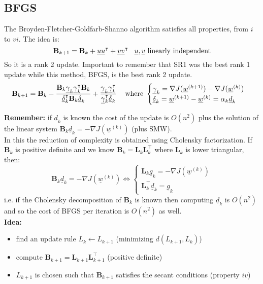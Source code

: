 \subsection{BFGS}
The Broyden-Fletcher-Goldfarb-Shanno algorithm satisfies all properties, from $i$ to $vi$. The idea is:
\[
    \mathbf{B}_{k+1} = \mathbf{B}_k + \underline{u}\underline{u}^\intercal + \underline{v}\underline{v}^\intercal \hspace{0.3cm} \underline{u},\underline{v}\text{ linearly independent} 
\] 
So it is a rank 2 update. Important to remember that SR1 was the best rank 1 update while this method, BFGS, is the best rank 2 update.
\[
    \mathbf{B}_{k+1} = \mathbf{B}_k - \frac{\mathbf{B}_k\underline{\gamma}_k\underline{\gamma}_k^\intercal \mathbf{B}_k}{\underline{\delta}_k^\intercal \mathbf{B}_k \underline{\delta}_k} + \frac{\underline{\gamma}_k\underline{\gamma}_k^\intercal}{\underline{\gamma}_k^\intercal \underline{\delta}_k} \hspace{0.3cm} \text{ where } \begin{cases}
        \underline{\gamma}_k = \nabla J(\underline{w}^{(k+1)}) - \nabla J(\underline{w}^{(k)})\\
        \underline{\delta}_k = \underline{w}^{(k+1)} - \underline{w}^{(k)} = \alpha_k \underline{d}_k
    \end{cases}
\]

\textbf{Remember: } if $\underline{d}_k$ is known the cost of the update is $O(n^2)$ plus the solution of the linear system $\mathbf{B}_k \underline{d}_k = - \nabla J(\underline{w}^{(k)})$ (plus SMW). \\

In this the reduction of complexity is obtained using Cholensky factorization. If $\mathbf{B}_k$ is positive definite and we know $\mathbf{B}_k = \mathbf{L}_k \mathbf{L}_k^\intercal$ where $\mathbf{L}_k$ is lower triangular, then:
\[
    \mathbf{B}_k \underline{d}_k = - \nabla J(\underline{w}^{(k)}) \iff \begin{cases}
        \mathbf{L}_k \underline{g}_k = - \nabla J(\underline{w}^{(k)})\\
        \mathbf{L}_k^\intercal \underline{d}_k = \underline{g}_k
    \end{cases}
\]
i.e. if the Cholensky decomposition of $\mathbf{B}_k$ is known then computing $\underline{d}_k$ is $O(n^2)$ and so the cost of BFGS per iteration is $O(n^2)$ as well.\\

\textbf{Idea: } 
\begin{itemize}
    \item find an update rule $L_k \leftarrow L_{k+1}$ (minimizing $d(L_{k+1}, L_k)$)
    \item compute $\mathbf{B}_{k+1} = \mathbf{L}_{k+1}\mathbf{L}_{k+1}^\intercal$ (positive definite)
    \item $L_{k+1}$ is chosen such that $\mathbf{B}_{k+1}$ satisfies the secant conditions (property $iv$)
\end{itemize}


